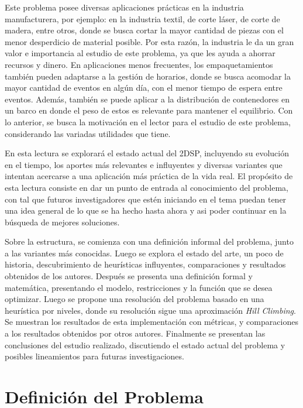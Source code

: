 \documentclass[letter, 10pt]{article}
\begin{document}
Este problema posee diversas aplicaciones prácticas en la industria manufacturera, por ejemplo: en la industria textil, de corte láser, de corte de madera, entre otros, donde se busca cortar la mayor cantidad de piezas con el menor desperdicio de material posible. Por esta razón, la industria le da un gran valor e importancia al estudio de este problema, ya que les ayuda a ahorrar recursos y dinero. En aplicaciones menos frecuentes, los empaquetamientos también pueden adaptarse a la gestión de horarios, donde se busca acomodar la mayor cantidad de eventos en algún día, con el menor tiempo de espera entre eventos. Además, también se puede aplicar a la distribución de contenedores en un barco en donde el peso de estos es relevante para mantener el equilibrio. Con lo anterior, se busca la motivación en el lector para el estudio de este problema, considerando las variadas utilidades que tiene.

En esta lectura se explorará el estado actual del 2DSP, incluyendo su evolución en el tiempo, los aportes más relevantes e influyentes y diversas variantes que intentan acercarse a una aplicación más práctica de la vida real. El propósito de esta lectura consiste en dar un punto de entrada al conocimiento del problema, con tal que futuros investigadores que estén iniciando en el tema puedan tener una idea general de lo que se ha hecho hasta ahora y asi poder continuar en la búsqueda de mejores soluciones.

Sobre la estructura, se comienza con una definición informal del problema, junto a las variantes más conocidas. Luego se explora el estado del arte, un poco de historia, descubrimiento de heurísticas influyentes, comparaciones y resultados obtenidos de los autores. Después se presenta una definición formal y matemática, presentando el modelo, restricciones y la función que se desea optimizar. Luego se propone una resolución del problema basado en una heurística por niveles, donde su resolución sigue una aproximación \textit{Hill Climbing}. Se muestran los resultados de esta implementación con métricas, y comparaciones a los resultados obtenidos por otros autores. Finalmente se presentan las conclusiones del estudio realizado, discutiendo el estado actual del problema y posibles lineamientos para futuras investigaciones.




\section{Definición del Problema}
\end{document}
